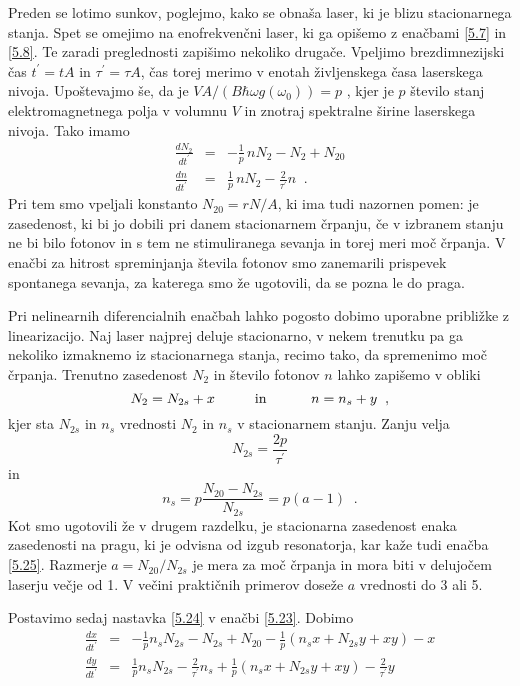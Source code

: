 Preden se lotimo sunkov, poglejmo, kako se obnaša laser, ki je blizu
stacionarnega stanja. Spet se omejimo na enofrekvenčni laser, ki ga
opišemo z enačbami \ref{5.7} in \ref{5.8}. Te zaradi preglednosti
zapišimo nekoliko drugače. Vpeljimo brezdimnezijski čas $t^{\prime}=t A$
in $\tau^{\prime}=\tau A$, čas torej merimo v enotah življenskega časa
laserskega nivoja. Upoštevajmo še, da je $VA/(B\hbar\omega g(\omega_0))=p$%
, kjer je $p$ število stanj elektromagnetnega polja v volumnu $V$ in
znotraj spektralne širine laserskega nivoja. Tako imamo 
\begin{eqnarray}  \label{5.23}
\frac{d N_2}{d t^{\prime}}&=&-\frac{1}{p}\,nN_2-N_2+N_{20} \\
\frac{d n}{d t^{\prime}}& = & \frac{1}{p}\,nN_2-\frac{2}{\tau^{\prime}}n
\;\;.
\end{eqnarray}
Pri tem smo vpeljali konstanto $N_{20}= rN/A$, ki ima tudi nazornen pomen:
je zasedenost, ki bi jo dobili pri danem stacionarnem črpanju, če v
izbranem stanju ne bi bilo fotonov in s tem ne stimuliranega sevanja in
torej meri moč črpanja. V enačbi za hitrost spreminjanja števila fotonov
smo zanemarili prispevek spontanega sevanja, za katerega smo že ugotovili,
da se pozna le do praga.

Pri nelinearnih diferencialnih enačbah lahko pogosto dobimo upora\-bne
približke z linearizacijo. Naj laser najprej deluje stacionarno, v nekem
trenutku pa ga nekoliko izmaknemo iz stacionarnega stanja, recimo tako, da
spremenimo moč črpanja. Trenutno zasedenost $N_2$ in število fotonov $n$
lahko zapišemo v obliki 
\begin{equation}  \label{5.24}
N_2= N_{2s}+x \mbox{\hskip 1cm in \hskip 1cm} n=n_s+y\;\;,
\end{equation}
kjer sta $N_{2s}$ in $n_s$ vrednosti $N_2$ in $n_s$ v stacionarnem stanju.
Zanju velja 
\begin{equation}  \label{5.25}
N_{2s}=\frac{2p}{\tau^{\prime}}
\end{equation}
in 
\begin{equation}  \label{5.26}
n_s=p\frac{N_{20}-N_{2s}}{N_{2s}}=p(a-1)\;\;.
\end{equation}
Kot smo ugotovili že v drugem razdelku, je stacionarna zasedenost enaka
zasedenosti na pragu, ki je odvisna od izgub resonatorja, kar kaže tudi
enačba \ref{5.25}. Razmerje $a=N_{20}/N_{2s}$ je mera za moč črpanja in
mora biti v delujočem laserju večje od 1. V večini praktičnih primerov
doseže $a$ vrednosti do 3 ali 5.

Postavimo sedaj nastavka \ref{5.24} v enačbi \ref{5.23}. Dobimo 
\begin{eqnarray}  \label{5.27}
\frac{d x}{d t^{\prime}} &=&-\frac{1}{p}n_sN_{2s}-N_{2s}+N_{20}- \frac{1}{p}
(n_sx+N_{2s}y+xy)-x \\
\frac{d y}{d t^{\prime}} &=& \frac{1}{p}n_sN_{2s}-\frac{2}{\tau^{\prime}}n_s
+ \frac{1}{p}(n_s x+N_{2s} y+xy)-\frac{2}{\tau^{\prime}}y
\end{eqnarray}

